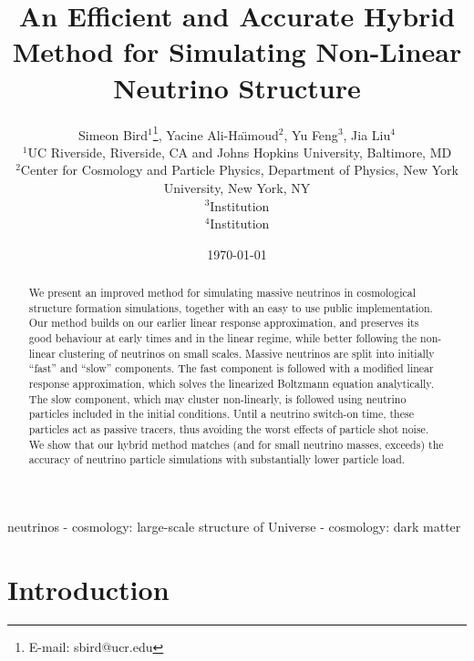 \documentclass[useAMS, usenatbib]{mnras}
\begin{document}
\title{An Efficient and Accurate Hybrid Method for Simulating Non-Linear Neutrino Structure}
\author[ S. Bird et al.]{Simeon Bird$^1$\thanks{E-mail: sbird@ucr.edu}, Yacine Ali-Ha\"{\i}moud$^2$, Yu Feng$^3$, Jia Liu$^4$\vspace{1.5mm}\\
$^1$UC Riverside, Riverside, CA  and Johns Hopkins University, Baltimore, MD\\
$^2$Center for Cosmology and Particle Physics, Department of Physics,
New York University, New York, NY\\
$^3$Institution\\
$^4$Institution}

\date{\today}

\pagerange{\pageref{firstpage}--\pageref{lastpage}} 
\label{firstpage}

\maketitle

\begin{abstract}
We present an improved method for simulating massive neutrinos in cosmological structure formation simulations, together with an easy to use public implementation.
Our method builds on our earlier linear response approximation, and preserves its good behaviour at early times and in the linear regime, while better following the non-linear clustering of neutrinos on small scales. Massive neutrinos are split into initially ``fast'' and ``slow'' components. The fast component is followed with a modified linear response approximation, which solves the linearized Boltzmann equation analytically. The slow component, which may cluster non-linearly, is followed using neutrino particles included in the initial conditions. Until a neutrino switch-on time, these particles act as passive tracers, thus avoiding the worst effects of particle shot noise. We show that our hybrid method matches (and for small neutrino masses, exceeds) the accuracy of neutrino particle simulations with substantially lower particle load.
\end{abstract}

\begin{keywords}
        neutrinos - cosmology: large-scale structure of Universe - cosmology: dark matter
\end{keywords}

\section{Introduction}
\end{document}
